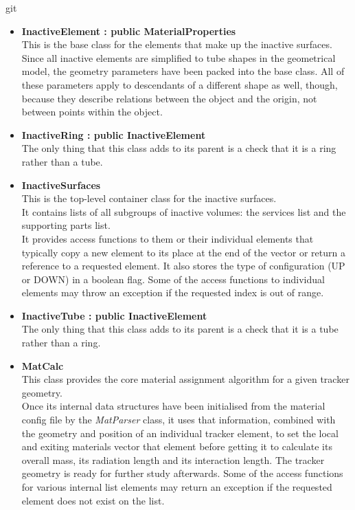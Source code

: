 git\documentclass[12pt, a4paper]{article}
\begin{document}
\begin{itemize}
\item \textbf{InactiveElement : public MaterialProperties}\\
This is the base class for the elements that make up the inactive surfaces.\\
Since all inactive elements are simplified to tube shapes in the geometrical model, the geometry parameters have been packed into the base class. All of these parameters apply to descendants of a different shape as well, though, because they describe relations between the object and the origin, not between points within the object.

\item \textbf{InactiveRing : public InactiveElement}\\
The only thing that this class adds to its parent is a check that it is a ring rather than a tube.

\item \textbf{InactiveSurfaces}\\
This is the top-level container class  for the inactive surfaces.\\
It contains lists of all subgroups of inactive volumes: the services list and the supporting parts list.\\
It provides access functions to them or their individual elements that typically copy a new element to its place at the end of the vector or return a reference to a requested element. It also stores the type of configuration (UP or DOWN) in a boolean flag. Some of the access functions to individual elements may throw an exception if the requested index is out of range.

\item \textbf{InactiveTube : public InactiveElement}\\
The only thing that this class adds to its parent is a check that it is a tube rather than a ring.

\item \textbf{MatCalc}\\
This class provides the core material assignment algorithm for a given tracker geometry.\\
Once its internal data structures have been initialised from the material config file by the \emph{MatParser} class, it uses that information, combined with the geometry and position of an individual tracker element, to set the local and exiting materials vector that element before getting it to calculate its overall mass, its radiation length and its interaction length. The tracker geometry is ready for further study afterwards. Some of the access functions for various internal list elements may return an exception if the requested element does not exist on the list.

\end{itemize}
\end{document}
